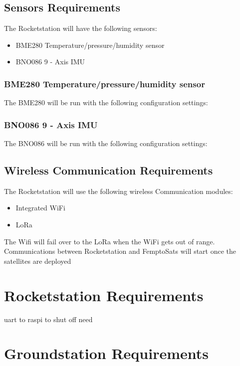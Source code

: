 \documentclass{book}
\begin{document}
\subsection{Sensors Requirements}
\par The Rocketstation will have the following sensors: 
\begin{itemize}
    \item BME280 Temperature/pressure/humidity sensor
    \item BNO086 9 - Axis IMU
\end{itemize}

\subsubsection{BME280 Temperature/pressure/humidity sensor}
\par The BME280 will be run with the following configuration settings: 

\subsubsection{BNO086 9 - Axis IMU}
\par The BNO086 will be run with the following configuration settings:

\subsection{Wireless Communication Requirements}
\par The Rocketstation will use the following wireless Communication modules:
\begin{itemize}
    \item Integrated WiFi
    \item LoRa
\end{itemize}
\par The Wifi will fail over to the LoRa when the WiFi gets out of range. Communications between Rocketstation and FemptoSats will start once the satellites are deployed

\section{Rocketstation Requirements}
\par uart to raspi to shut off need
\section{Groundstation Requirements}





%

%
%
\end{document}
